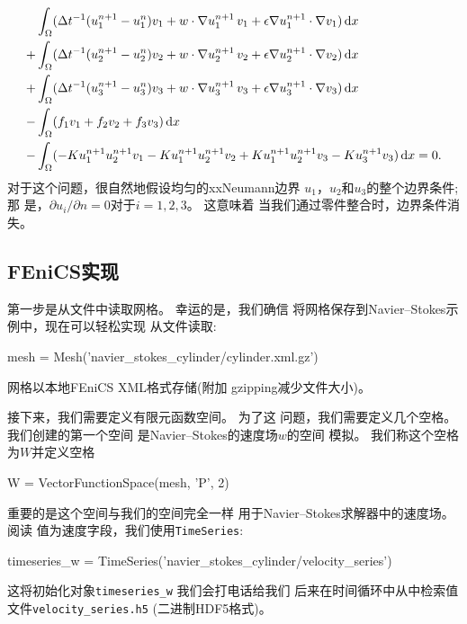 \begin{align}
  \label{ftut1:reactionsystem:varproblem}
  & \int_{\Omega}
  (\dt^{-1} (u_1^{n+1} - u_1^n) v_1 + w \cdot \nabla u^{n+1}_1 \, v_1
  + \epsilon \nabla u^{n+1}_1 \cdot \nabla v_1) \dx \\
  + & \int_{\Omega} (\dt^{-1} (u_2^{n+1} - u_2^n) v_2
  + w \cdot \nabla u^{n+1}_2 \, v_2
  + \epsilon \nabla u^{n+1}_2 \cdot \nabla v_2) \dx \nonumber \\
  + & \int_{\Omega} (\dt^{-1} (u_3^{n+1} - u_3^n) v_3
  + w \cdot \nabla u^{n+1}_3 \, v_3
  + \epsilon \nabla u^{n+1}_3 \cdot \nabla v_3) \dx \nonumber \\
  - & \int_{\Omega} (f_1 v_1 + f_2 v_2 + f_3 v_3) \dx \nonumber \\
  - & \int_{\Omega} (-K u^{n+1}_1 u^{n+1}_2 v_1 - K u^{n+1}_1
  u^{n+1}_2 v_2 + K u^{n+1}_1 u^{n+1}_2 v_3 - K u^{n+1}_3 v_3) \dx = 0.
  \nonumber
\end{align}
对于这个问题，很自然地假设均匀的xxNeumann边界
$u_1$，$u_2$和$u_3$的整个边界条件; 那
是，$\partial u_i/\partial n = 0$对于$i = 1, 2, 3$。 这意味着
当我们通过零件整合时，边界条件消失。

\subsection{FEniCS实现}

第一步是从文件中读取网格。 幸运的是，我们确信
将网格保存到Navier--Stokes示例中，现在可以轻松实现
从文件读取:

\begin{python}
mesh = Mesh('navier_stokes_cylinder/cylinder.xml.gz')
\end{python}
网格以本地FEniCS XML格式存储(附加
gzipping减少文件大小)。

接下来，我们需要定义有限元函数空间。 为了这
问题，我们需要定义几个空格。 我们创建的第一个空间
是Navier--Stokes的速度场$w$的空间
模拟。 我们称这个空格为$W$并定义空格

\begin{python}
W = VectorFunctionSpace(mesh, 'P', 2)
\end{python}
重要的是这个空间与我们的空间完全一样
用于Navier--Stokes求解器中的速度场。 阅读
值为速度字段，我们使用\texttt{TimeSeries}:


\begin{python}
timeseries_w = TimeSeries('navier_stokes_cylinder/velocity_series')
\end{python}
这将初始化对象\verb!timeseries_w! 我们会打电话给我们
后来在时间循环中从中检索值
文件\verb!velocity_series.h5! (二进制HDF5格式)。

